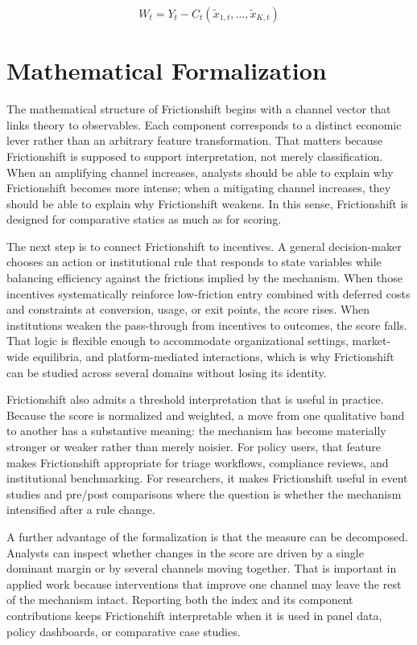 \documentclass[12pt]{article}
\begin{document}
\begin{equation}
W_t = Y_t - C_t(\tilde{x}_{1,t}, \dots, \tilde{x}_{K,t})
\label{eq:welfare}
\end{equation}

\section{Mathematical Formalization}
The mathematical structure of Frictionshift begins with a channel vector that links theory to observables. Each component corresponds to a distinct economic lever rather than an arbitrary feature transformation. That matters because Frictionshift is supposed to support interpretation, not merely classification. When an amplifying channel increases, analysts should be able to explain why Frictionshift becomes more intense; when a mitigating channel increases, they should be able to explain why Frictionshift weakens. In this sense, Frictionshift is designed for comparative statics as much as for scoring.

The next step is to connect Frictionshift to incentives. A general decision-maker chooses an action or institutional rule that responds to state variables while balancing efficiency against the frictions implied by the mechanism. When those incentives systematically reinforce low-friction entry combined with deferred costs and constraints at conversion, usage, or exit points, the score rises. When institutions weaken the pass-through from incentives to outcomes, the score falls. That logic is flexible enough to accommodate organizational settings, market-wide equilibria, and platform-mediated interactions, which is why Frictionshift can be studied across several domains without losing its identity.

Frictionshift also admits a threshold interpretation that is useful in practice. Because the score is normalized and weighted, a move from one qualitative band to another has a substantive meaning: the mechanism has become materially stronger or weaker rather than merely noisier. For policy users, that feature makes Frictionshift appropriate for triage workflows, compliance reviews, and institutional benchmarking. For researchers, it makes Frictionshift useful in event studies and pre/post comparisons where the question is whether the mechanism intensified after a rule change.

A further advantage of the formalization is that the measure can be decomposed. Analysts can inspect whether changes in the score are driven by a single dominant margin or by several channels moving together. That is important in applied work because interventions that improve one channel may leave the rest of the mechanism intact. Reporting both the index and its component contributions keeps Frictionshift interpretable when it is used in panel data, policy dashboards, or comparative case studies.
\end{document}
